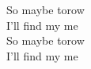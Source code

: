 \songwordfb{} So maybe torow \\
I'll find my  me \\
\songwordfb{} So maybe torow \\
I'll find my  me \\
